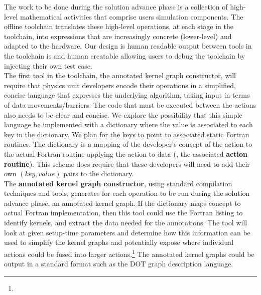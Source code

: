 \documentclass{article}
\begin{document}
The work to be done during the solution advance
phase is a collection of high-level mathematical activities
that comprise \FlashOfTheFuture users simulation components.
The offline toolchain translates these high-level operations, at each stage in
the toolchain,
into expressions that are increasingly concrete (lower-level) and adapted to the
hardware.  Our design is human readable output between
tools in the toolchain
is
and human creatable allowing users
to debug the toolchain by injecting their own test case.\\

The first tool in the toolchain, the annotated kernel graph
constructor, will require that physics unit developers encode their operations in a
simplified, concise language that expresses the underlying algorithm, taking input in terms of
data movements/barriers. The code that must be executed between the actions
also needs to be clear and concise.  We explore the possibility that this simple language be
implemented with a dictionary where the value is associated to each key in the
dictionary.  We plan for the keys to point to associated static Fortran routines.
 The dictionary is a mapping of the developer's concept of the action to the
actual Fortran routine applying the action to data (\ie, the associated
\textbf{action routine}).  This scheme does require
that these developers will need to add their own $(key, value)$ pairs to the
dictionary.\\

The \textbf{annotated kernel graph constructor}, using standard compilation
techniques and tools, generates for
each operation to be run during the solution advance phase, an annotated kernel
graph.  If the dictionary maps concept to actual Fortran implementation, then
this tool could use the Fortran listing to identify kernels,
 and extract the data needed for
the annotations.  The tool will look at given setup-time
parameters and determine how this information can be used to simplify the kernel
graphs and potentially expose where individual actions could be fused into
larger actions.\footnote{
}  The annotated kernel graphs could be output
in a standard format such as the DOT graph description language.
\end{document}
